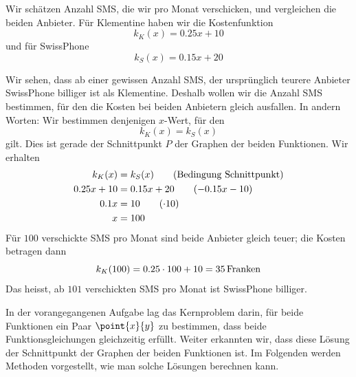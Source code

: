 \documentclass[%
11pt,%
twoside,%
titlepage,%
german,%
headsepline%
]{scrartcl}
\begin{document}
\begin{bsp}
\noindent Wir sch\"atzen Anzahl SMS, die wir pro Monat verschicken, und vergleichen die beiden Anbieter. F\"ur Klementine haben wir die Kostenfunktion
$$k_K(x)=0.25x+10$$
und f\"ur SwissPhone
$$k_S(x)=0.15x+20$$
\vspace*{1ex}
\begin{center}
\end{center}
Wir sehen, dass ab einer gewissen Anzahl SMS, der urspr\"unglich teurere Anbieter SwissPhone billiger ist als Klementine. Deshalb wollen wir die Anzahl SMS bestimmen, f\"ur den die Kosten bei beiden Anbietern gleich ausfallen. In andern Worten: Wir bestimmen denjenigen $x$-Wert, f\"ur den
$$k_K(x)=k_S(x)$$
gilt. Dies ist gerade der Schnittpunkt $P$ der Graphen der beiden Funktionen.
Wir erhalten
\begin{align}
k_K(x)&=k_S(x)\tag{Bedingung Schnittpunkt}\\
0.25x+10&=0.15x+20\tag{$-0.15x-10$}\\
0.1x&=10\tag{$\cdot10$}\\
x&=100\notag
\end{align}
F\"ur $100$ verschickte SMS pro Monat sind beide Anbieter gleich teuer; die Kosten betragen dann
$$k_K(100)=0.25\cdot100+10=\unit[35]{Franken}$$
Das heisst, ab $101$ verschickten SMS pro Monat ist SwissPhone billiger.
\end{bsp}
In der vorangegangenen Aufgabe lag das Kernproblem darin, f\"ur beide Funktionen ein Paar $\point{x}{y}$ zu bestimmen, dass beide Funktionsgleichungen gleichzeitig erf\"ullt. Weiter erkannten wir, dass diese L\"osung der Schnittpunkt der Graphen der beiden Funktionen ist. Im Folgenden werden Methoden vorgestellt, wie man solche L\"osungen berechnen kann.
\end{document}
